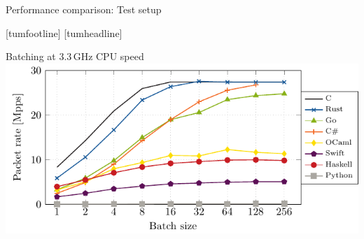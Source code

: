 \documentclass[NET,english,aspectratio=169,notitleframe]{tumbeamer}
\begin{document}

\begin{frame}{Performance comparison: Test setup}
\centering
\end{frame}
[tumfootline]
[tumheadline]



\begin{frame}{Batching at 3.3\,GHz CPU speed}
\centering\includegraphics[scale=1]{figures/batches-33.pdf}
\end{frame}

%
\end{document}
